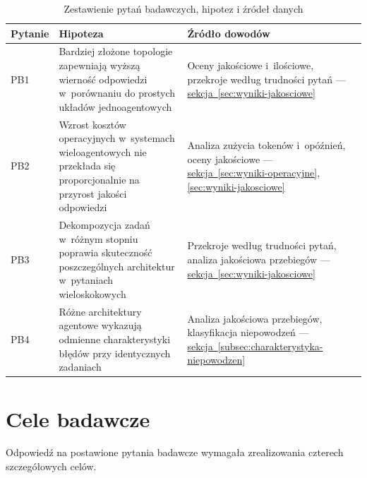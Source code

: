 \begin{table}[H]
  \caption{Zestawienie pytań badawczych, hipotez i źródeł danych}\label{tab:zestawienie-pytan-badawczych-hipotez-i-zrodel-danych}
  \centering
  \small
  \renewcommand{\arraystretch}{1.3}
  \begin{tabularx}{\textwidth}{@{} l X X @{}}
    \toprule
    \textbf{Pytanie} & \textbf{Hipoteza}                                                         & \textbf{Źródło dowodów} \\
    \midrule
    PB1
    & Bardziej złożone topologie zapewniają wyższą wierność odpowiedzi
    w~porównaniu do prostych układów jednoagentowych
    & Oceny jakościowe i~ilościowe, przekroje według trudności pytań
    --- \hyperref[sec:wyniki-jakosciowe]{sekcja~\ref*{sec:wyniki-jakosciowe}}                                              \\
    PB2
    & Wzrost kosztów operacyjnych w~systemach wieloagentowych nie przekłada się
    proporcjonalnie na przyrost jakości odpowiedzi
    & Analiza zużycia tokenów i~opóźnień, oceny jakościowe
    --- \hyperref[sec:wyniki-operacyjne]{sekcja~\ref*{sec:wyniki-operacyjne}},
    \hyperref[sec:wyniki-jakosciowe]{\ref*{sec:wyniki-jakosciowe}}                                                         \\
    PB3
    & Dekompozycja zadań w~różnym stopniu poprawia skuteczność poszczególnych
    architektur w~pytaniach wieloskokowych
    & Przekroje według trudności pytań, analiza jakościowa przebiegów
    --- \hyperref[sec:wyniki-jakosciowe]{sekcja~\ref*{sec:wyniki-jakosciowe}}                                              \\
    PB4
    & Różne architektury agentowe wykazują odmienne charakterystyki błędów
    przy identycznych zadaniach
    & Analiza jakościowa przebiegów, klasyfikacja niepowodzeń
    --- \hyperref[subsec:charakterystyka-niepowodzen]{sekcja~\ref*{subsec:charakterystyka-niepowodzen}}                    \\
    \bottomrule
  \end{tabularx}
\end{table}

\section{Cele badawcze}\label{sec:cele-badawcze}

Odpowiedź na postawione pytania badawcze wymagała zrealizowania czterech
szczegółowych celów.

